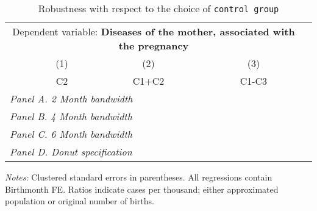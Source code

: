 \begin{table}[H] \begin{threeparttable} \centering \caption{Robustness with respect to the choice of \texttt{control group}} {\def\sym#1{\ifmmode^{#1}\else\(^{#1}\)\fi} \begin{tabular}{l*{4}{c}} \toprule \multicolumn{4}{c}{Dependent variable: \textbf{Diseases of the mother, associated with the pregnancy}} \\ \cmidrule(lr){2-4}
            &\multicolumn{1}{c}{(1)}&\multicolumn{1}{c}{(2)}&\multicolumn{1}{c}{(3)}\\
            &\multicolumn{1}{c}{C2}&\multicolumn{1}{c}{C1+C2}&\multicolumn{1}{c}{C1-C3}\\
\midrule
 \multicolumn{4}{l}{\emph{Panel A. 2 Month bandwidth}} \\    \midrule\multicolumn{4}{l}{\emph{Panel B. 4 Month bandwidth}} \\    \midrule\multicolumn{4}{l}{\emph{Panel C. 6 Month bandwidth}} \\    \midrule\multicolumn{4}{l}{\emph{Panel D. Donut specification}} \\    
\bottomrule \end{tabular} } \begin{tablenotes} \item \scriptsize \emph{Notes:} Clustered standard errors in parentheses. All regressions contain Birthmonth FE. Ratios indicate cases per thousand; either approximated population or original number of births. \end{tablenotes} \end{threeparttable} \end{table} 
